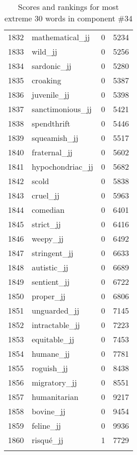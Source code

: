 \begin{longtable}[!htbp]{| rlr@{.}l |}
    1832 & mathematical\_jj & 0 & 5234 \\
    1833 & wild\_jj & 0 & 5256 \\
    1834 & sardonic\_jj & 0 & 5280 \\
    1835 & croaking & 0 & 5387 \\
    1836 & juvenile\_jj & 0 & 5398 \\
    1837 & sanctimonious\_jj & 0 & 5421 \\
    1838 & spendthrift & 0 & 5446 \\
    1839 & squeamish\_jj & 0 & 5517 \\
    1840 & fraternal\_jj & 0 & 5602 \\
    1841 & hypochondriac\_jj & 0 & 5682 \\
    1842 & scold & 0 & 5838 \\
    1843 & cruel\_jj & 0 & 5963 \\
    1844 & comedian & 0 & 6401 \\
    1845 & strict\_jj & 0 & 6416 \\
    1846 & weepy\_jj & 0 & 6492 \\
    1847 & stringent\_jj & 0 & 6633 \\
    1848 & autistic\_jj & 0 & 6689 \\
    1849 & sentient\_jj & 0 & 6722 \\
    1850 & proper\_jj & 0 & 6806 \\
    1851 & unguarded\_jj & 0 & 7145 \\
    1852 & intractable\_jj & 0 & 7223 \\
    1853 & equitable\_jj & 0 & 7453 \\
    1854 & humane\_jj & 0 & 7781 \\
    1855 & roguish\_jj & 0 & 8438 \\
    1856 & migratory\_jj & 0 & 8551 \\
    1857 & humanitarian & 0 & 9217 \\
    1858 & bovine\_jj & 0 & 9454 \\
    1859 & feline\_jj & 0 & 9936 \\
    1860 & risqué\_jj & 1 & 7729 \\
    \hline
    \caption{Scores and rankings for most extreme 30 words in component \#34} \\
\end{longtable}
